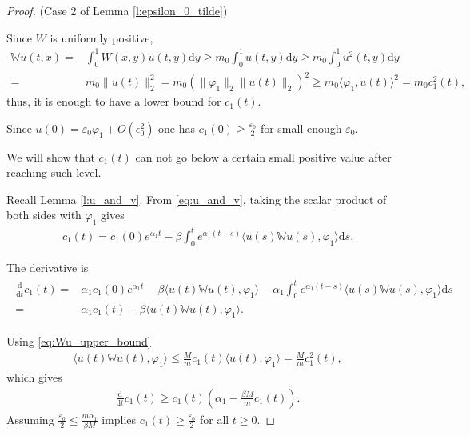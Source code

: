 \documentclass{article}
\renewcommand{\d}{\mathrm{d}}
\newcommand{\W}{\mathbb{W}}
\newcommand{\1}[1]{{\mathds{1}}_{\left\{#1\right\}}}
\begin{document}
\begin{proof}(Case 2 of Lemma \ref{l:epsilon_0_tilde})
	
	Since $W$ is uniformly positive,
	\begin{align*}
		\W u(t,x)=&\int_{0}^{1} W(x,y)u(t,y) \d y \geq m_0 \int_{0}^{1}u(t,y) \d y \geq m_0 \int_{0}^{1}u^2(t,y) \d y  \\
		=& m_0 \|u(t) \|_2^2=m_0 \left( \|\varphi_1 \|_2 \|u(t) \|_2 \right)^2 \geq m_0 \langle \varphi_1, u(t) \rangle^2 =m_0 c_1^2(t),
	\end{align*}	
	thus, it is enough to have a lower bound for $c_1(t).$
	
	Since $u(0)=\varepsilon_0 \varphi_1+O\left(\epsilon_0^2 \right)$ one has $c_1(0) \geq \frac{\varepsilon_0}{2}$ for small enough $\varepsilon_0.$
	
	We will show that $c_1(t)$ can not go below a certain small positive value after reaching such level.
	
	Recall Lemma \ref{l:u_and_v}. From \eqref{eq:u_and_v}, taking the scalar product of both sides with $\varphi_1$ gives
	\begin{align*}
		c_1(t)=c_1(0)e^{\alpha_1 t}-\beta \int_{0}^{t}e^{\alpha_1(t-s)}\langle u(s) \W u(s), \varphi_1 \rangle \d s.
	\end{align*}
	
	The derivative is
	\begin{align}
		\label{eq:diff_c1}
		\begin{split}
			\frac{\d}{\d t}c_1(t)=&\alpha_1 c_1(0)e^{\alpha_1 t}-\beta \langle u(t) \W u(t), \varphi_1 \rangle-\alpha_1 \int_{0}^{t}e^{\alpha_1(t-s)}\langle u(s) \W u(s), \varphi_1 \rangle \d s \\
			=& \alpha_1 c_1(t)-\beta  \langle u(t) \W u(t), \varphi_1 \rangle.
		\end{split}	
	\end{align}
	
	Using \eqref{eq:Wu_upper_bound}
	\begin{align*}
		\langle u(t) \W u(t), \varphi_1 \rangle \leq  \frac{M}{m}c_1(t) \langle u(t) , \varphi_1 \rangle=\frac{M}{m}c_1^2(t),
	\end{align*}
	which gives
	\begin{align*}
		\frac{\d}{\d t} c_1(t) \geq c_1(t) \left( \alpha_1-\frac{\beta M}{m}c_1(t) \right).
	\end{align*}
	Assuming $\frac{\varepsilon_0}{2} \leq \frac{m \alpha_1}{\beta M} $ implies $c_1(t) \geq \frac{\varepsilon_0}{2}$ for all $t \geq 0$.		
\end{proof}
\end{document}
